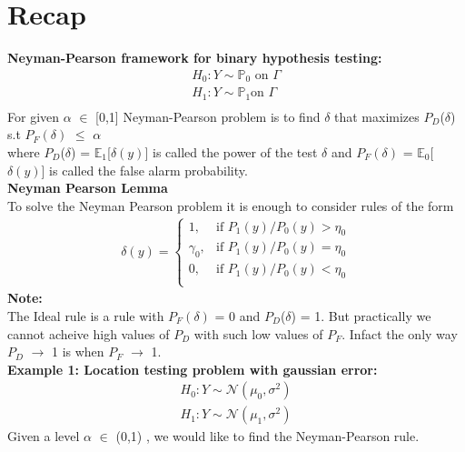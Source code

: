\documentclass[12pt]{report}
\begin{document}
\maketitle
\section{Recap}
{\bf Neyman-Pearson framework for binary hypothesis testing: }
\begin{align*}
H_0 : Y \sim \mathbb{P}_0  \text{ on   } \Gamma \\ 
H_1 : Y \sim \mathbb{P}_1   \text{on   } \Gamma \\[-10pt]
\end{align*}
For given $\alpha$ $\in$ [0,1] Neyman-Pearson problem is to find $\delta$ that maximizes 
$P_D$($\delta$) s.t $P_F(\delta)$ $\leq$ $\alpha$\\
where $P_D$($\delta$) = $\mathbb{E}_1$[$\delta(y)$] is called the power of the test $\delta$ and 
$P_F(\delta)$ = $\mathbb{E}_0$[$\delta(y)$] is called the false alarm probability.\\[15pt]
{\bf Neyman Pearson Lemma}\\
To solve the Neyman Pearson problem it is enough to consider rules of the form
\begin{align*}
 \delta(y) = \left\{ \begin{array}{cc}
1, &  \text{if }P_1(y)/P_0(y)>\eta_0 \\
\gamma_0, & \text{if }P_1(y)/P_0(y)=\eta_0\\
0, &  \text{if }P_1(y)/P_0(y) < \eta_0 \\
\end{array}\right. 
\end{align*}
{\bf Note:}\\
The Ideal rule is a rule with $P_F(\delta)$ = 0 and $P_D$($\delta$) = 1. But practically we cannot acheive high values of $P_D$
with such low values of $P_F$. Infact the only way $P_D$ $\to$ 1 is when $P_F$ $\to$ 1.\\[12pt]
{\bf Example 1: Location testing problem with gaussian error:}\\[-10pt]
\begin{align*}
H_0 : Y  \sim  \mathcal{N}(\mu_0,\sigma^2)\\
H_1 : Y  \sim  \mathcal{N}(\mu_1,\sigma^2)
\end{align*}
Given a level $\alpha $ $ \in $ (0,1) , we would like to find the Neyman-Pearson rule.\\
\end{document}
